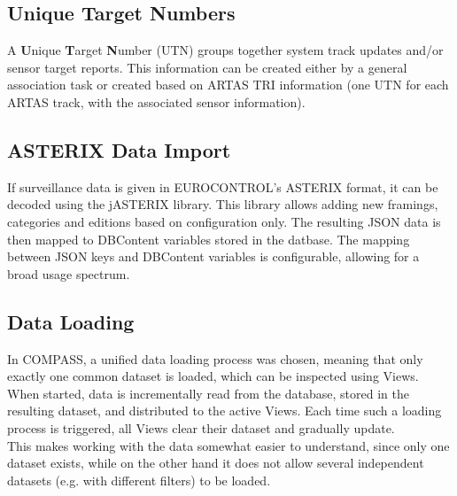 \subsection*{Unique Target Numbers}
A \textbf{U}nique \textbf{T}arget \textbf{N}umber (UTN) groups together system track updates and/or sensor target reports.
This information can be created either by a general association task or created based on ARTAS TRI information (one UTN for each ARTAS track, with the associated sensor information).

\subsection*{ASTERIX Data Import}
If surveillance data is given in EUROCONTROL's ASTERIX format, it can be decoded using the jASTERIX library. This library allows adding new framings, categories and editions based on configuration only. The resulting JSON data is then mapped to DBContent variables stored in the datbase. The mapping between JSON keys and DBContent variables is configurable, allowing for a broad usage spectrum.


\subsection*{Data Loading}
In COMPASS, a unified data loading process was chosen, meaning that only exactly one common dataset is loaded, which can be inspected using Views. When started, data is incrementally read from the database, stored in the resulting dataset, and distributed to the active Views. Each time such a loading process is triggered, all Views clear their dataset and gradually update. \\
This makes working with the data somewhat easier to understand, since only one dataset exists, while on the other hand it does not allow several independent datasets (e.g. with different filters) to be loaded.


 

